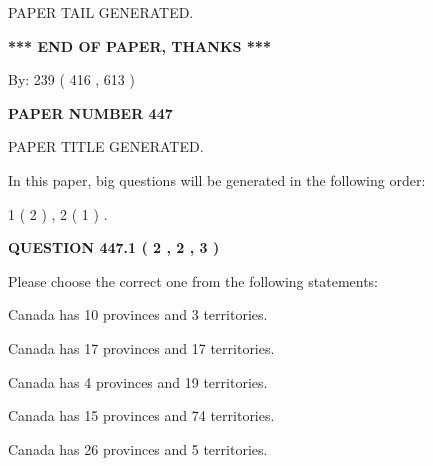 \documentclass[12pt]{article}
\begin{document}
   
   
\vspace{2.0in} PAPER TAIL GENERATED.
   
   
   
   
\vspace{1.0in} 
{\textbf{\large{ *** END OF PAPER, THANKS *** }}} 
   
   
\hspace{1.0in} By: 
 239 ( 416 ,  613 )
   
   
   
   
\newpage 
\setcounter{page}{ 
   447001 } 
   
   
   
   
 {\textbf{ \Large{ PAPER NUMBER  447  }}}
   
   
\vspace{0.2in}
   
   
   
   
   
   
   
   
 \vspace{0.2in}
 
 
 
 
   
   
 PAPER TITLE GENERATED.
   
   
   
\vspace{0.2in}
   
In this paper, big questions will be generated in the following order: 
   
   
   1 ( 2 )
 ,
   2 ( 1 )
 .
  
\vspace{0.2in}
  
{\textbf{\Large{QUESTION
447.1 
 ( 2 , 2 , 3 )
}}}
  
  
Please choose the correct one from the following statements:
 
 
Canada has 10  provinces and 3 territories.
 
 
Canada has  17 provinces and  17 territories.
 
 
Canada has   4 provinces and  19 territories.
 
 
Canada has  15 provinces and  74 territories.
 
 
Canada has  26 provinces and  5 territories.
 
\end{document}
